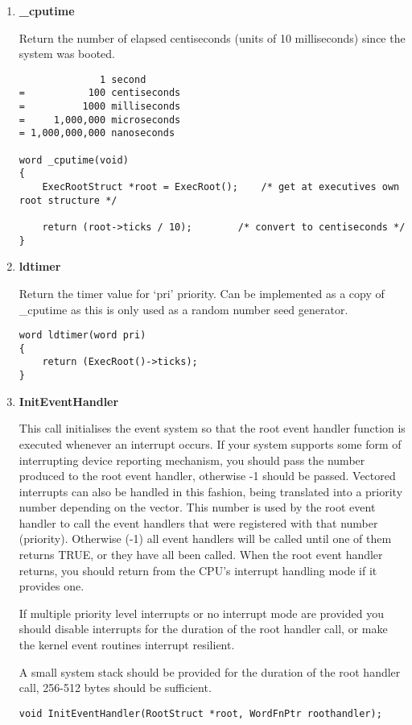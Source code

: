 \begin{enumerate}
\item {\bf \_cputime}

Return the number of elapsed centiseconds (units of 10 milliseconds)
since the system was booted.

\scriptsize
\begin{verbatim}
              1 second
=           100 centiseconds
=          1000 milliseconds
=     1,000,000 microseconds
= 1,000,000,000 nanoseconds

word _cputime(void)
{
    ExecRootStruct *root = ExecRoot();    /* get at executives own root structure */

    return (root->ticks / 10);        /* convert to centiseconds */
}
\end{verbatim}
\normalsize

\item {\bf ldtimer}

Return the timer value for `pri' priority. Can be
implemented as a copy of \_cputime as this is only used as a random number
seed generator.
\scriptsize
\begin{verbatim}
word ldtimer(word pri)
{
    return (ExecRoot()->ticks);
}
\end{verbatim}
\normalsize

\item {\bf InitEventHandler}

This call initialises the event system so that the root event handler function
is executed whenever an interrupt occurs.
If your system supports some form of interrupting device reporting
mechanism, you should pass the number produced to the root event handler,
otherwise -1 should be passed. Vectored interrupts can also be handled
in this fashion, being translated into a priority number depending on the
vector. This number is used by the root event
handler to call the event handlers that were registered with that number
(priority). Otherwise (-1) all event handlers will be called until one of
them returns TRUE, or they have all been called. When the root event handler
returns, you should return from the CPU's interrupt handling mode if it
provides one.

If multiple priority level interrupts or no interrupt mode
are provided you should disable interrupts for the duration of the root
handler call, or make the kernel event routines interrupt resilient.

A small system stack should be provided for the duration of the root
handler call, 256-512 bytes should be sufficient.
\scriptsize
\begin{verbatim}
void InitEventHandler(RootStruct *root, WordFnPtr roothandler);


\end{verbatim}
\end{enumerate}
